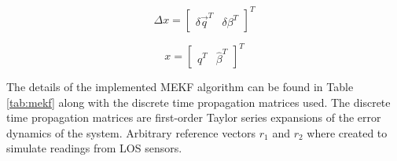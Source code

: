 \documentclass{article}
\begin{document}
\begin{equation}
	\Delta x = [\begin{matrix}\delta\vec{q}^T & \delta\beta^T \end{matrix}]^T
	\label{eqn:mekf_dx}
\end{equation}

\begin{equation}
	x = [\begin{matrix} \hat{q}^T & \hat{\beta}^T \end{matrix}]^T
	\label{eqn:mekf_x}
\end{equation}

The details of the implemented MEKF algorithm can be found in Table \ref{tab:mekf} along with the discrete time propagation matrices used. The discrete time propagation matrices are first-order Taylor series expansions of the error dynamics of the system. Arbitrary reference vectors $r_1$ and $r_2$ where created to simulate readings from LOS sensors.
\end{document}
